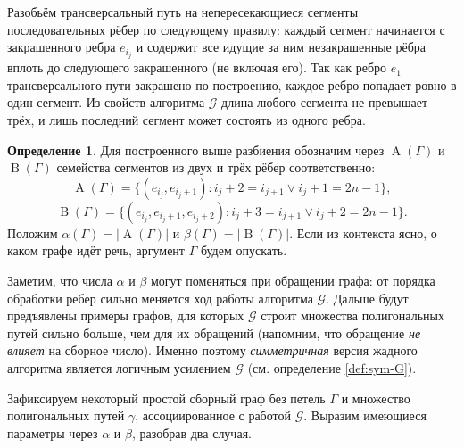 \documentclass{article}
\theoremstyle{definition}
\newtheorem{definition}[theorem]{Определение}
\newcommand{\G}{\mathcal{G}}
\newcommand{\A}{\operatorname{A}}
\newcommand{\B}{\operatorname{B}}
\begin{document}
Разобьём трансверсальный путь на непересекающиеся сегменты последовательных рёбер по следующему правилу: каждый сегмент начинается с закрашенного ребра $e_{i_j}$ и содержит все идущие за ним незакрашенные рёбра вплоть до следующего закрашенного (не включая его). Так как ребро $e_1$ трансверсального пути закрашено по построению, каждое ребро попадает ровно в один сегмент. 
Из свойств алгоритма $\G$ длина любого сегмента не превышает трёх, 
и лишь последний сегмент может состоять из одного ребра.

\begin{definition}
Для построенного выше разбиения обозначим через $\A(\Gamma)$ и $\B(\Gamma)$ 
семейства сегментов из двух и трёх рёбер соответственно:
\[
    \A(\Gamma) = \{(e_{i_j}, e_{i_j + 1}) : i_{j} + 2 = i_{j + 1} 
                 \vee i_j + 1 = 2n - 1\},
\]
\[
    \B(\Gamma) = \{(e_{i_j}, e_{i_j + 1}, e_{i_j + 2}) : i_{j} + 3 = i_{j + 1} 
                 \vee i_j + 2 = 2n - 1\}.
\]
Положим $\alpha(\Gamma) = |\A(\Gamma)|$ и $\beta(\Gamma) = |\B(\Gamma)|$. 
Если из контекста ясно, о каком графе идёт речь, аргумент $\Gamma$ будем опускать.
\end{definition}

Заметим, что числа $\alpha$ и $\beta$ могут поменяться при обращении графа: от порядка обработки ребер сильно меняется ход работы алгоритма $\G$. Дальше будут предъявлены примеры графов, для которых $\G$ строит множества полигональных путей сильно больше, чем для их обращений (напомним, что обращение \emph{не влияет} на сборное число). Именно поэтому \emph{симметричная} версия жадного алгоритма является логичным усилением $\G$ (см. определение \ref{def:sym-G}).

Зафиксируем некоторый простой сборный граф без петель $\Gamma$ и множество полигональных путей $\gamma$, ассоциированное с работой $\G$. Выразим имеющиеся параметры через $\alpha$ и $\beta$, разобрав два случая.
\end{document}
